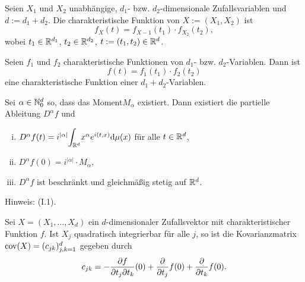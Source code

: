 \begin{thm}
  Seien $X_1$ und $X_2$ unabhängige, $d_1$- bzw. $d_2$-dimensionale
  Zufallsvariablen und $d := d_1 + d_2$. Die charakteristische Funktion von $X
  := (X_1, X_2)$ ist
  \[ f_X(t) = f_{X-1}(t_1) \cdot f_{X_2}(t_2), \]
  wobei $t_1 \in \mathbb{R}^{d_1}$, $t_2 \in \mathbb{R}^{d_2}$, $t := (t_1, t_2) \in
  \mathbb{R}^d$.
\end{thm}

\begin{folg} %
  Seien $f_1$ und $f_2$ charakteristische Funktionen von $d_1$- bzw.
  $d_2$-Variablen. Dann ist
  \[ f(t) = f_1 (t_1) \cdot f_2(t_2) \]
  eine charakteristische Funktion einer $d_1 + d_2$-Variablen.
\end{folg}

\begin{thm}
  Sei $\alpha \in \mathbb{N}_0^d$ so, dass das Moment\footnotemark $M_\alpha$
  existiert. Dann existiert die partielle Ableitung $D^\alpha f$ und
  \begin{enumerate}[(i)]
  \item $D^\alpha f(t) = i^{|\alpha|} {\displaystyle \int_{\mathbb{R}^d}} x^\alpha
    e^{i(t,x)} \mathrm{d} \mu(x)$ für alle $t \in \mathbb{R}^d$,
  \item $D^\alpha f(0) = i^{|\alpha|} \cdot M_\alpha$,
  \item $D^\alpha f$ ist beschränkt und gleichmäßig stetig auf $\mathbb{R}^d$.
  \end{enumerate}
\end{thm}

Hinweis: (I.1).

\begin{folg}
  Sei $X = (X_1, \ldots, X_d)$ ein $d$-dimensionaler Zufallsvektor mit
  charakteristischer Funktion $f$. Ist $X_j$ quadratisch integrierbar für alle
  $j$, so ist die Kovarianzmatrix $\operatorname{cov}(X) = (c_{jk})_{j,k=1}^d$ gegeben durch
  \[ c_{jk} = - \frac{\partial f}{\partial t_j \partial t_k}(0) + \frac{\partial }{\partial t_j}f(0) +
    \frac{\partial }{\partial t_k} f(0). \]
\end{folg}


